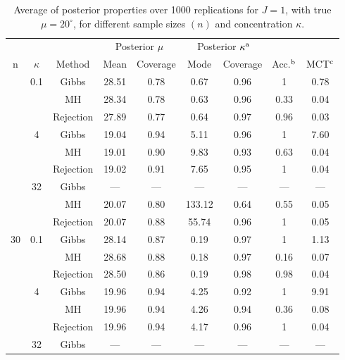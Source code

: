 \documentclass[]{gSCS2e}
\theoremstyle{plain}
\theoremstyle{definition}
\theoremstyle{remark}
\begin{document}
\begin{table}
\begin{minipage}{0.90\textwidth}
\begin{center}
\caption{\label{J1}Average of posterior properties over 1000 replications for $J=1$, with true $\mu = 20^\circ$, for different sample sizes $(n)$ and concentration $\kappa$.}
{\begin{tabular}{ccccccccc}
  \toprule 
 &&& \multicolumn{2}{c}{Posterior $\mu$} & \multicolumn{2}{c}{Posterior $\kappa^{\rm a}$  }&  \\
   n & $\kappa$ & Method & Mean & Coverage & Mode & Coverage
                                            & Acc.$^{\rm b}$ & MCT$^{\rm c}$ \\
 \colrule 
 5 & 0.1 & Gibbs & 28.51 & 0.78 & 0.67 & 0.96 & 1 & 0.78 \\ 
   &  & MH & 28.34 & 0.78 & 0.63 & 0.96 & 0.33 & 0.04 \\ 
   \vspace{0.2cm} &  & Rejection & 27.89 & 0.77 & 0.64 & 0.97 & 0.96 & 0.03 \\ 
   & 4 & Gibbs & 19.04 & 0.94 & 5.11 & 0.96 & 1 & 7.60 \\ 
   &  & MH & 19.01 & 0.90 & 9.83 & 0.93 & 0.63 & 0.04 \\ 
   \vspace{0.2cm} &  & Rejection & 19.02 & 0.91 & 7.65 & 0.95 & 1 & 0.04 \\ 
   & 32 & Gibbs & --- & --- & --- & --- & --- & --- \\ 
   &  & MH & 20.07 & 0.80 & 133.12 & 0.64 & 0.55 & 0.05 \\ 
   &  & Rejection & 20.07 & 0.88 & 55.74 & 0.96 & 1 & 0.05 \\ 
   \cmidrule{1-9}30 & 0.1 & Gibbs & 28.14 & 0.87 & 0.19 & 0.97 & 1 & 1.13 \\ 
   &  & MH & 28.68 & 0.88 & 0.18 & 0.97 & 0.16 & 0.07 \\ 
   \vspace{0.2cm} &  & Rejection & 28.50 & 0.86 & 0.19 & 0.98 & 0.98 & 0.04 \\ 
   & 4 & Gibbs & 19.96 & 0.94 & 4.25 & 0.92 & 1 & 9.91 \\ 
   &  & MH & 19.96 & 0.94 & 4.26 & 0.94 & 0.36 & 0.08 \\ 
   \vspace{0.2cm} &  & Rejection & 19.96 & 0.94 & 4.17 & 0.96 & 1 & 0.04 \\ 
   & 32 & Gibbs & --- & --- & --- & --- & --- & --- \\ 

\end{tabular}}
\end{center}
\end{minipage}
\end{table}
\end{document}
